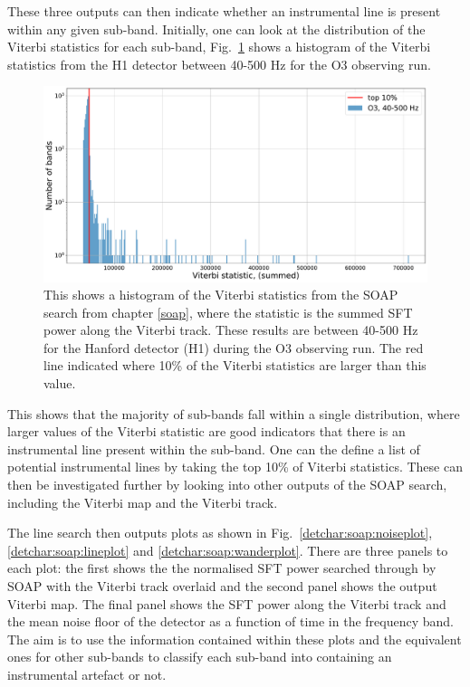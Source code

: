 These three outputs can then indicate whether an instrumental line is present within any given sub-band.
Initially, one can look at the distribution of the Viterbi statistics for each sub-band, Fig.~\ref{detchar:soap:rankedstats} shows a histogram of the Viterbi statistics from the H1 detector between 40-500 Hz for the O3 observing run.
%
\begin{figure}[ht]
	\centering
	\includegraphics[width=\textwidth]{C6_detchar/statistic_hists_O3_H1.pdf}
	\caption[Viterbi statistics for H1 in O3, 40-500 Hz]{This shows a histogram of the Viterbi statistics from the SOAP search from chapter \ref{soap}, where the statistic is the summed \gls{SFT}  power along the Viterbi track. These results are between 40-500 Hz for the Hanford detector (H1) during the O3 observing run. The red line indicated where 10\% of the Viterbi statistics are larger than this value. }
	\label{detchar:soap:rankedstats}
\end{figure}
%
This shows that the majority of sub-bands fall within a single distribution, where larger values of the Viterbi statistic are good indicators that there is an instrumental line present within the sub-band.
One can the define a list of potential instrumental lines by taking the top 10\% of Viterbi statistics. 
These can then be investigated further by looking into other outputs of the SOAP search, including the Viterbi map and the Viterbi track.

%
The line search then outputs plots as shown in Fig.~\ref{detchar:soap:noiseplot}, \ref{detchar:soap:lineplot} and
\ref{detchar:soap:wanderplot}. 
There are three panels to each plot: the first shows the the normalised \gls{SFT} power searched through by SOAP with the Viterbi track overlaid and the second panel shows the output Viterbi map.
The final panel shows the \gls{SFT} power along the Viterbi track and the mean noise floor of the detector as a function of time in the frequency band.  
The aim is to use the information contained within these plots and the equivalent ones for other sub-bands to classify each sub-band into containing an instrumental artefact or not. 

